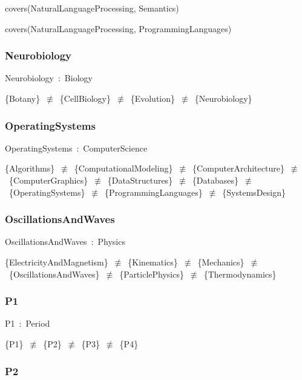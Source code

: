 \documentclass{article}
\begin{document}
covers(NaturalLanguageProcessing, Semantics)

covers(NaturalLanguageProcessing, ProgrammingLanguages)

\subsubsection*{Neurobiology}

Neurobiology~:~Biology

\{Botany\}~\ensuremath{\not\equiv}~\{CellBiology\}~\ensuremath{\not\equiv}~\{Evolution\}~\ensuremath{\not\equiv}~\{Neurobiology\}

\subsubsection*{OperatingSystems}

OperatingSystems~:~ComputerScience

\{Algorithms\}~\ensuremath{\not\equiv}~\{ComputationalModeling\}~\ensuremath{\not\equiv}~\{ComputerArchitecture\}~\ensuremath{\not\equiv}~\{ComputerGraphics\}~\ensuremath{\not\equiv}~\{DataStructures\}~\ensuremath{\not\equiv}~\{Databases\}~\ensuremath{\not\equiv}~\{OperatingSystems\}~\ensuremath{\not\equiv}~\{ProgrammingLanguages\}~\ensuremath{\not\equiv}~\{SystemsDesign\}

\subsubsection*{OscillationsAndWaves}

OscillationsAndWaves~:~Physics

\{ElectricityAndMagnetism\}~\ensuremath{\not\equiv}~\{Kinematics\}~\ensuremath{\not\equiv}~\{Mechanics\}~\ensuremath{\not\equiv}~\{OscillationsAndWaves\}~\ensuremath{\not\equiv}~\{ParticlePhysics\}~\ensuremath{\not\equiv}~\{Thermodynamics\}

\subsubsection*{P1}

P1~:~Period

\{P1\}~\ensuremath{\not\equiv}~\{P2\}~\ensuremath{\not\equiv}~\{P3\}~\ensuremath{\not\equiv}~\{P4\}

\subsubsection*{P2}
\end{document}
